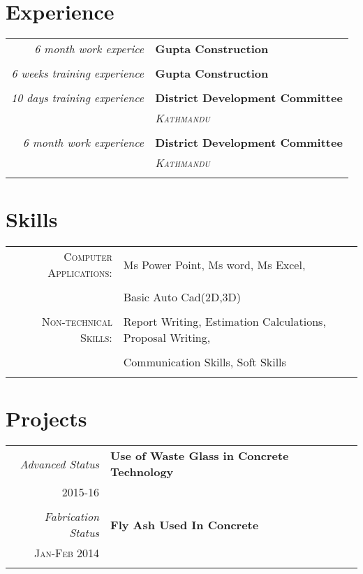 \documentclass[a4paper,10pt]{article}
\begin{document}
\section{Experience}
\begin{tabular}{r|p{11cm}}
\emph{6 month work experice} & \textbf{Gupta Construction}\\\multicolumn{2}{c}{} \\
 \emph{6 weeks training experience} & \textbf{Gupta Construction}\\\multicolumn{2}{c}{} \\
 \emph{10 days training experience} & \textbf{District Development Committee }\\ & \emph{\textsc{Kathmandu}}\\\multicolumn{2}{c}{} \\
  \emph{6 month work experience} & \textbf{District Development Committee }\\ & \emph{\textsc{Kathmandu}}\\\multicolumn{2}{c}{} \\
\end{tabular}

\section{Skills}
\begin{tabular}{rl}	
\textsc{Computer Applications:} &Ms Power Point, Ms word, Ms Excel,\\\\& Basic Auto Cad(2D,3D)   \\\\
\textsc{Non-technical Skills:} &Report Writing, Estimation Calculations, Proposal Writing, \\\\& Communication Skills, Soft Skills\\\\			 
\end{tabular}


\section{Projects}
\begin{tabular}{r|p{11cm}}

\emph{Advanced Status} & \textbf{Use of Waste Glass in Concrete Technology}\\ \textsc{2015-16} & \small{}\\\multicolumn{2}{c}{} \\


\emph{Fabrication Status} & \textbf{Fly Ash Used In Concrete}\\ \textsc{Jan-Feb 2014} & \small{}\\\multicolumn{2}{c}{} \\

\end{tabular}
\end{document}
